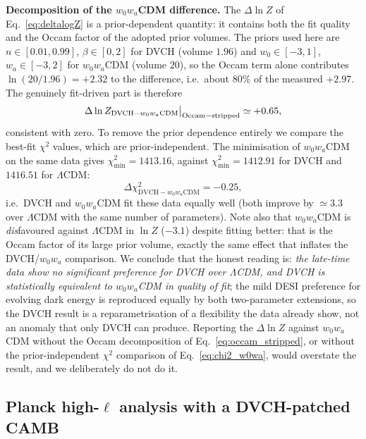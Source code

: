 \documentclass[pdflatex,sn-mathphys-num]{sn-jnl}%
\begin{document}
\noindent\textbf{Decomposition of the $w_0w_a$CDM difference.}\quad
The $\Delta\ln Z$ of Eq.~\eqref{eq:deltalogZ} is a prior-dependent quantity:
it contains both the fit quality and the Occam factor of the adopted prior
volumes. The priors used here are $n\in[0.01,0.99]$, $\beta\in[0,2]$ for DVCH
(volume $1.96$) and $w_0\in[-3,1]$, $w_a\in[-3,2]$ for $w_0w_a$CDM (volume
$20$), so the Occam term alone contributes $\ln(20/1.96)=+2.32$ to the
difference, i.e.\ about $80\%$ of the measured $+2.97$. The genuinely
fit-driven part is therefore
\begin{equation}
\Delta\ln Z_{\mathrm{DVCH}-w_0w_a\mathrm{CDM}}\big|_{\rm Occam-stripped}
\simeq +0.65 ,
\label{eq:occam_stripped}
\end{equation}
consistent with zero. To remove the prior dependence entirely we compare the
best-fit $\chi^2$ values, which are prior-independent. The minimisation of
$w_0w_a$CDM on the same data gives $\chi^2_{\min}=1413.16$, against
$\chi^2_{\min}=1412.91$ for DVCH and $1416.51$ for $\Lambda$CDM:
\begin{equation}
\Delta\chi^2_{\mathrm{DVCH}-w_0w_a\mathrm{CDM}} = -0.25 ,
\label{eq:chi2_w0wa}
\end{equation}
i.e.\ DVCH and $w_0w_a$CDM fit these data equally well (both improve by
$\simeq3.3$ over $\Lambda$CDM with the same number of parameters). Note
also that $w_0w_a$CDM is \emph{dis}favoured against $\Lambda$CDM in
$\ln Z$ ($-3.1$) despite fitting better: that is the Occam factor of its
large prior volume, exactly the same effect that inflates the DVCH/$w_0w_a$
comparison. We conclude that the honest reading is: \emph{the late-time
data show no significant preference for DVCH over $\Lambda$CDM, and DVCH is
statistically equivalent to $w_0w_a$CDM in quality of fit}; the mild DESI
preference for evolving dark energy
\cite{Adame:2024ywp} is reproduced equally by both two-parameter
extensions, so the DVCH result is a reparametrisation of a flexibility the
data already show, not an anomaly that only DVCH can produce. Reporting the
$\Delta\ln Z$ against $w_0w_a$CDM without the Occam decomposition of
Eq.~\eqref{eq:occam_stripped}, or without the prior-independent
$\chi^2$ comparison of Eq.~\eqref{eq:chi2_w0wa}, would overstate the
result, and we deliberately do not do it.
\subsection{Planck high-$\ell$ analysis with a DVCH-patched CAMB}
\label{subsec:planck_results}
\end{document}
